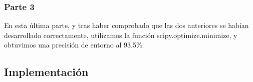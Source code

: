 \documentclass[11pt]{article}
\begin{document}
\subsubsection {Parte 3}

 En esta última parte, y tras haber comprobado que las dos anteriores se habían desarrollado correctamente, utilizamos la función scipy.optimize.minimize, y obtuvimos una precisión de entorno al 93.5\%.

\newpage
\subsection{Implementación}


\end{document}
